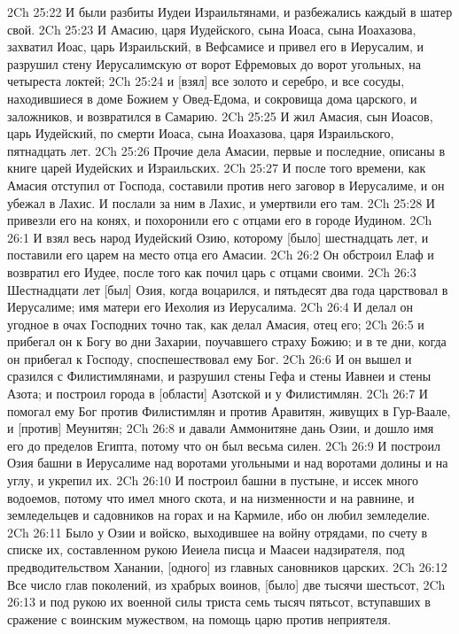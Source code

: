 2Ch 25:22  И были разбиты Иудеи Израильтянами, и разбежались каждый в шатер свой.
2Ch 25:23  И Амасию, царя Иудейского, сына Иоаса, сына Иоахазова, захватил Иоас, царь Израильский, в Вефсамисе и привел его в Иерусалим, и разрушил стену Иерусалимскую от ворот Ефремовых до ворот угольных, на четыреста локтей;
2Ch 25:24  и [взял] все золото и серебро, и все сосуды, находившиеся в доме Божием у Овед-Едома, и сокровища дома царского, и заложников, и возвратился в Самарию.
2Ch 25:25  И жил Амасия, сын Иоасов, царь Иудейский, по смерти Иоаса, сына Иоахазова, царя Израильского, пятнадцать лет.
2Ch 25:26  Прочие дела Амасии, первые и последние, описаны в книге царей Иудейских и Израильских.
2Ch 25:27  И после того времени, как Амасия отступил от Господа, составили против него заговор в Иерусалиме, и он убежал в Лахис. И послали за ним в Лахис, и умертвили его там.
2Ch 25:28  И привезли его на конях, и похоронили его с отцами его в городе Иудином.
2Ch 26:1  И взял весь народ Иудейский Озию, которому [было] шестнадцать лет, и поставили его царем на место отца его Амасии.
2Ch 26:2  Он обстроил Елаф и возвратил его Иудее, после того как почил царь с отцами своими.
2Ch 26:3  Шестнадцати лет [был] Озия, когда воцарился, и пятьдесят два года царствовал в Иерусалиме; имя матери его Иехолия из Иерусалима.
2Ch 26:4  И делал он угодное в очах Господних точно так, как делал Амасия, отец его;
2Ch 26:5  и прибегал он к Богу во дни Захарии, поучавшего страху Божию; и в те дни, когда он прибегал к Господу, споспешествовал ему Бог.
2Ch 26:6  И он вышел и сразился с Филистимлянами, и разрушил стены Гефа и стены Иавнеи и стены Азота; и построил города в [области] Азотской и у Филистимлян.
2Ch 26:7  И помогал ему Бог против Филистимлян и против Аравитян, живущих в Гур-Ваале, и [против] Меунитян;
2Ch 26:8  и давали Аммонитяне дань Озии, и дошло имя его до пределов Египта, потому что он был весьма силен.
2Ch 26:9  И построил Озия башни в Иерусалиме над воротами угольными и над воротами долины и на углу, и укрепил их.
2Ch 26:10  И построил башни в пустыне, и иссек много водоемов, потому что имел много скота, и на низменности и на равнине, и земледельцев и садовников на горах и на Кармиле, ибо он любил земледелие.
2Ch 26:11  Было у Озии и войско, выходившее на войну отрядами, по счету в списке их, составленном рукою Иеиела писца и Маасеи надзирателя, под предводительством Ханании, [одного] из главных сановников царских.
2Ch 26:12  Все число глав поколений, из храбрых воинов, [было] две тысячи шестьсот,
2Ch 26:13  и под рукою их военной силы триста семь тысяч пятьсот, вступавших в сражение с воинским мужеством, на помощь царю против неприятеля.
